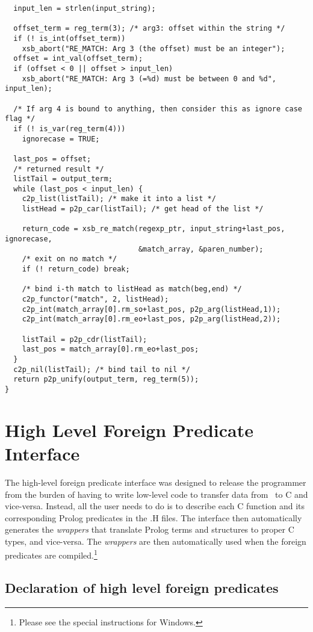 \begin{verbatim}
  input_len = strlen(input_string);
  
  offset_term = reg_term(3); /* arg3: offset within the string */
  if (! is_int(offset_term))
    xsb_abort("RE_MATCH: Arg 3 (the offset) must be an integer");
  offset = int_val(offset_term);
  if (offset < 0 || offset > input_len)
    xsb_abort("RE_MATCH: Arg 3 (=%d) must be between 0 and %d", input_len);

  /* If arg 4 is bound to anything, then consider this as ignore case flag */
  if (! is_var(reg_term(4)))
    ignorecase = TRUE;

  last_pos = offset;
  /* returned result */
  listTail = output_term;
  while (last_pos < input_len) {
    c2p_list(listTail); /* make it into a list */
    listHead = p2p_car(listTail); /* get head of the list */

    return_code = xsb_re_match(regexp_ptr, input_string+last_pos, ignorecase,
                               &match_array, &paren_number);
    /* exit on no match */
    if (! return_code) break;

    /* bind i-th match to listHead as match(beg,end) */
    c2p_functor("match", 2, listHead);
    c2p_int(match_array[0].rm_so+last_pos, p2p_arg(listHead,1));
    c2p_int(match_array[0].rm_eo+last_pos, p2p_arg(listHead,2));

    listTail = p2p_cdr(listTail);
    last_pos = match_array[0].rm_eo+last_pos;
  }
  c2p_nil(listTail); /* bind tail to nil */
  return p2p_unify(output_term, reg_term(5));
}
\end{verbatim}

\section{High Level Foreign Predicate Interface}

The high-level foreign predicate interface was designed to release the
programmer from the burden of having to write low-level code to transfer
data from \ourprolog\ to C and vice-versa.  Instead, all the user needs to
do is to describe each C function and its corresponding Prolog predicates
in the .H files. The interface then automatically generates the
\emph{wrappers} that translate Prolog terms and structures to proper C
types, and vice-versa. The \emph{wrappers} are then automatically used when
the foreign predicates are compiled.\footnote{Please see the special
  instructions for Windows.}

\subsection{Declaration of high level foreign predicates}

